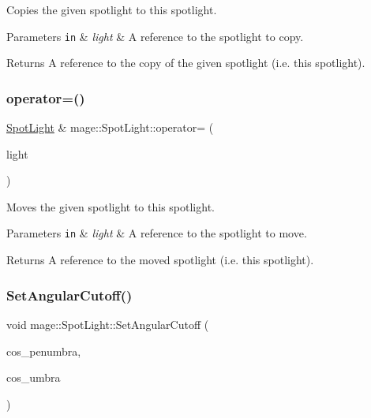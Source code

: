 Copies the given spotlight to this spotlight.


\begin{DoxyParams}[1]{Parameters}
\mbox{\tt in}  & {\em light} & A reference to the spotlight to copy. \\
\hline
\end{DoxyParams}
\begin{DoxyReturn}{Returns}
A reference to the copy of the given spotlight (i.\+e. this spotlight). 
\end{DoxyReturn}
\hypertarget{classmage_1_1_spot_light_ab79e4bf1c488c1a753f434a4d84567e5}{}\label{classmage_1_1_spot_light_ab79e4bf1c488c1a753f434a4d84567e5} 
\subsubsection{\texorpdfstring{operator=()}{operator=()}\hspace{0.1cm}{\footnotesize\ttfamily [2/2]}}
{\footnotesize\ttfamily \hyperlink{classmage_1_1_spot_light}{Spot\+Light} \& mage\+::\+Spot\+Light\+::operator= (\begin{DoxyParamCaption}\item[{\hyperlink{classmage_1_1_spot_light}{Spot\+Light} \&\&}]{light }\end{DoxyParamCaption})\hspace{0.3cm}{\ttfamily [default]}}

Moves the given spotlight to this spotlight.


\begin{DoxyParams}[1]{Parameters}
\mbox{\tt in}  & {\em light} & A reference to the spotlight to move. \\
\hline
\end{DoxyParams}
\begin{DoxyReturn}{Returns}
A reference to the moved spotlight (i.\+e. this spotlight). 
\end{DoxyReturn}
\hypertarget{classmage_1_1_spot_light_aff7fad222e3c8e41d6fbeeea7f3a0893}{}\label{classmage_1_1_spot_light_aff7fad222e3c8e41d6fbeeea7f3a0893} 
\subsubsection{\texorpdfstring{Set\+Angular\+Cutoff()}{SetAngularCutoff()}}
{\footnotesize\ttfamily void mage\+::\+Spot\+Light\+::\+Set\+Angular\+Cutoff (\begin{DoxyParamCaption}\item[{\hyperlink{namespacemage_aa97e833b45f06d60a0a9c4fc22ae02c0}{F32}}]{cos\+\_\+penumbra,  }\item[{\hyperlink{namespacemage_aa97e833b45f06d60a0a9c4fc22ae02c0}{F32}}]{cos\+\_\+umbra }\end{DoxyParamCaption})\hspace{0.3cm}{\ttfamily [noexcept]}}

